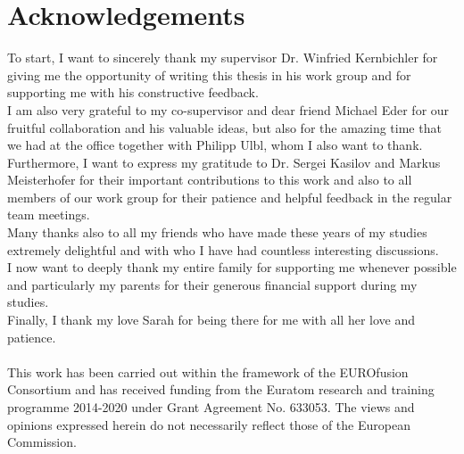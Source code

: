 \documentclass[./main.tex]{subfiles}
\begin{document}
\chapter*{Acknowledgements}
\label{chp:acknowledgements}
To start, I want to sincerely thank my supervisor Dr. Winfried Kernbichler for giving me the opportunity of writing this thesis in his work group and for supporting me with his constructive feedback. \\

I am also very grateful to my co-supervisor and dear friend Michael Eder for our fruitful collaboration and his valuable ideas, but also for the amazing time that we had at the office together with Philipp Ulbl, whom I also want to thank.\\

Furthermore, I want to express my gratitude to Dr. Sergei Kasilov and Markus Meisterhofer for their important contributions to this work and also to all members of our work group for their patience and helpful feedback in the regular team meetings. \\

Many thanks also to all my friends who have made these years of my studies extremely delightful and with who I have had countless interesting discussions.
\\

I now want to deeply thank my entire family for supporting me whenever possible and particularly my parents for their generous financial support during my studies. 
\\

Finally, I thank my love Sarah for being there for me with all her love and patience.\\ \\
This work has been carried out within the framework of the EUROfusion Consortium and has received funding from the Euratom research and training programme 2014-2020 under Grant Agreement No. 633053. The views and opinions expressed herein do not necessarily reflect those of the European Commission.
\end{document}
